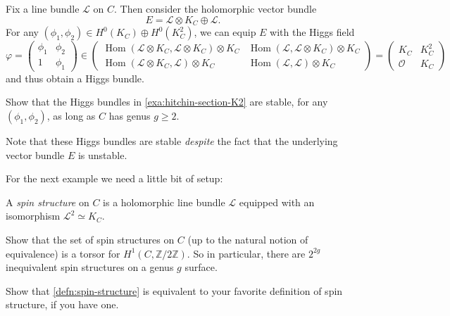 \documentclass[12pt,letterpaper,reqno]{article}
\numberwithin{equation}{section}
\newcommand{\cL}{\ensuremath{\mathcal L}}
\newcommand{\cO}{\ensuremath{\mathcal O}}
\newcommand{\Z}{\ensuremath{\mathbb Z}}
\newcommand{\ti}[1]{\textit{#1}}
\DeclareMathOperator{\Hom}{Hom}
\begin{document}
\begin{example} \label{exa:hitchin-section-K2} 
Fix a line bundle
$\cL$ on $C$.
Then consider the holomorphic vector
bundle
\begin{equation}
  E = \cL \otimes K_C \oplus \cL.
\end{equation}
For any $(\phi_1, \phi_2) \in H^0(K_C) \oplus H^0(K_C^2)$,
we can equip $E$ with the Higgs field
\begin{equation}
  \varphi = \begin{pmatrix} \phi_1 & \phi_2 \\ 1 & \phi_1 \end{pmatrix} \in \begin{pmatrix} \Hom(\cL \otimes K_C,\cL \otimes K_C) \otimes K_C & \Hom(\cL,\cL \otimes K_C) \otimes K_C \\ \Hom(\cL \otimes K_C,\cL) \otimes K_C & \Hom(\cL,\cL) \otimes K_C \end{pmatrix} = \begin{pmatrix} K_C & K_C^2 \\ \cO & K_C \end{pmatrix}
\end{equation}
and thus obtain a Higgs bundle.
\end{example}

\begin{exercise}
Show that the Higgs bundles in \autoref{exa:hitchin-section-K2} are stable,
for any $(\phi_1,\phi_2)$,
as long as $C$ has genus $g \ge 2$.
\end{exercise}

Note that these Higgs bundles are stable \ti{despite} the fact that the underlying
vector bundle $E$ is unstable.

For the next example we need a little bit of setup:

\begin{defn} \label{defn:spin-structure} A \ti{spin structure} on $C$
is a holomorphic line bundle $\cL$ equipped with an isomorphism
$\cL^2 \simeq K_C$.
\end{defn}

\begin{exercise} Show that the set of spin structures on $C$ (up to 
the natural notion of equivalence) is a torsor for $H^1(C,\Z/2\Z)$.
So in particular, there are $2^{2g}$ inequivalent 
spin structures on a genus $g$ surface.
\end{exercise}

\begin{exercise} Show that
\autoref{defn:spin-structure} is equivalent
to your favorite definition of spin structure, if you have one.
\end{exercise}
\end{document}
